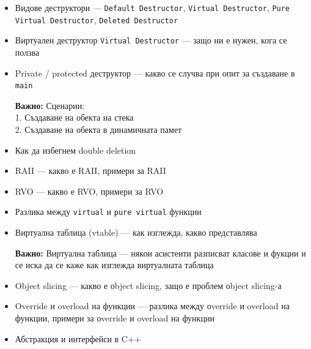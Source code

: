 \documentclass[a4paper,11pt]{article}
\newcommand{\nope}[1]{%
  \begin{tcolorbox}[warningbox]
    \faExclamationTriangle\quad\textbf{\color{warning}Важно:} #1
  \end{tcolorbox}%
}
\newcommand{\qtag}[1]{\texttt{\color{greenaccent}\small#1}}
\begin{document}
\begin{tcolorbox}[categorybox, title={3.\ Деструктори}]
\begin{itemize}
  \item Видове деструктори — \qtag{Default Destructor}, \qtag{Virtual Destructor}, \qtag{Pure Virtual Destructor}, \qtag{Deleted Destructor} 
  \item Виртуален деструктор \qtag{Virtual Destructor} — защо ни е нужен, кога се ползва
  \item Private / protected деструктор — какво се случва при опит за създаване в \qtag{main}
  \nope{%
  Сценарии: \\
  1. Създаване на обекта на стека \\
  2. Създаване на обекта в динамичната памет%
  }
  \item Как да избегнем double deletion
  \item RAII — какво е RAII, примери за RAII
  \item RVO — какво е RVO, примери за RVO
\end{itemize}
\end{tcolorbox}

\begin{tcolorbox}[categorybox, title={4.\ Виртуални функции и полиморфизъм}]
\begin{itemize}
  \item Разлика между \qtag{virtual} и \qtag{pure virtual} функции
  \item Виртуална таблица (vtable) — как изглежда, какво представлява
  \nope{Виртуална таблица — някои асистенти разписват класове и фукции и се иска да се каже как изглежда виртуалната таблица}
  \item Object slicing — какво е оbject slicing, защо е проблем оbject slicing-а
  \item Override и overload на функции — разлика между оverride и overload на функции, примери за оverride и overload на функции
  \item Абстракция и интерфейси в C++
\end{itemize}
\end{tcolorbox}
\end{document}
